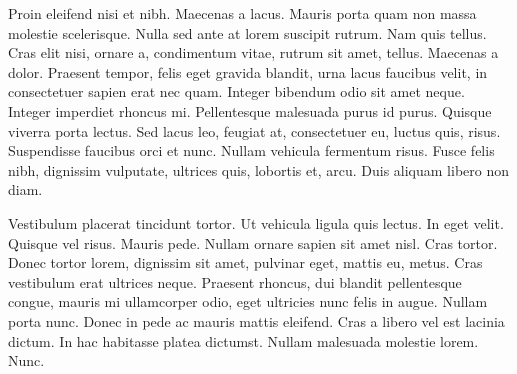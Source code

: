 Proin eleifend nisi et nibh. Maecenas a lacus. Mauris porta quam non massa
molestie scelerisque. Nulla sed ante at lorem suscipit rutrum. Nam quis tellus.
Cras elit nisi, ornare a, condimentum vitae, rutrum sit amet, tellus. Maecenas a
dolor. Praesent tempor, felis eget gravida blandit, urna lacus faucibus velit,
in consectetuer sapien erat nec quam. Integer bibendum odio sit amet neque.
Integer imperdiet rhoncus mi. Pellentesque malesuada purus id purus. Quisque
viverra porta lectus. Sed lacus leo, feugiat at, consectetuer eu, luctus quis,
risus. Suspendisse faucibus orci et nunc. Nullam vehicula fermentum risus. Fusce
felis nibh, dignissim vulputate, ultrices quis, lobortis et, arcu. Duis aliquam
libero non diam.

Vestibulum placerat tincidunt tortor. Ut vehicula ligula quis lectus. In eget
velit. Quisque vel risus. Mauris pede. Nullam ornare sapien sit amet nisl. Cras
tortor. Donec tortor lorem, dignissim sit amet, pulvinar eget, mattis eu, metus.
Cras vestibulum erat ultrices neque. Praesent rhoncus, dui blandit pellentesque
congue, mauris mi ullamcorper odio, eget ultricies nunc felis in augue. Nullam
porta nunc. Donec in pede ac mauris mattis eleifend. Cras a libero vel est
lacinia dictum. In hac habitasse platea dictumst. Nullam malesuada molestie
lorem. Nunc.

\outroformatting
